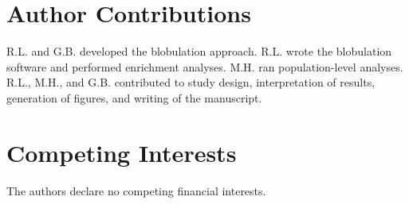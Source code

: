 \documentclass[9pt,twocolumn,twoside,lineno]{pnas-new}
\begin{document}
\section*{Author Contributions}
R.L. and G.B. developed the blobulation approach. R.L. wrote the blobulation software and performed enrichment analyses.  M.H. ran population-level analyses.  R.L., M.H., and G.B. contributed to study design, interpretation of results, generation of figures, and writing of the manuscript. 
 
\section*{Competing Interests} 
The authors declare no competing financial interests.

\end{document}
